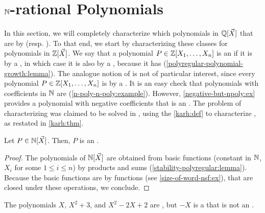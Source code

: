 \section{$\mathbb{N}$-rational Polynomials}
\label{polynomials:sec}

\AP In this section, we will completely characterize which polynomials in
$\mathbb{Q}[\vec{X}]$ that are  by 
(resp. ). To that end, we start by
characterizing these classes for polynomials in $\mathbb{Z}[\vec{X}]$.
We say that a polynomial $P \in \mathbb{Z}[X_1, \dots, X_n]$ is an
 if it is  by a
, in which case it is also  by a
, because it has 
(\cref{polyregular-polynomial-growth:lemma}).
The analogue notion of  is not
of particular interest, since every polynomial $P \in \mathbb{Z}[X_1, \dots, X_n]$ is
 by a . 
It is an easy check that
polynomials with coefficients in $\mathbb{N}$ are 
(\cref{n-poly-n-poly:example}). However, \cref{negative-but-npoly:ex} provides
a polynomial with negative coefficients that is an . 
The problem of characterizing  was claimed to
be solved in \cite{KARH77}, using the \cref{karh:def}
to  characterize
, as restated in \cref{karh:thm}.

\begin{lemma}
    \label{n-poly-n-poly:example}
    Let $P \in \mathbb{N}[\vec{X}]$. Then, $P$
    is an .
\end{lemma}
\begin{proof}
    The polynomials of $\mathbb{N}[\vec{X}]$
    are obtained from basic functions (constant in $\mathbb{N}$,
    $X_i$ for some $1 \leq i \leq n$)
    by products and sums (\cref{stability-polyregular:lemma}). Because the basic functions are
     by  functions (see
    \cref{size-of-word-nsf:ex}),
    that are closed under these operations, we conclude.
\end{proof}

\begin{example}
    \label{negative-but-npoly:ex}
    The polynomials $X$, $X^2 + 3$,
    and $X^2 - 2X + 2$
    are ,
    but $- X$ is a  that is 
    not an .
\end{example}



